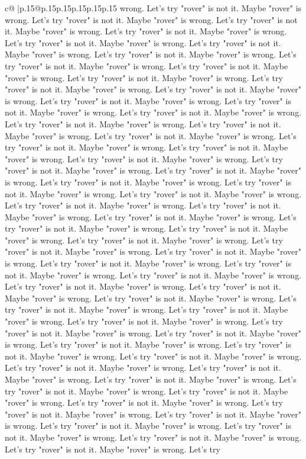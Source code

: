 \documentclass{article}
\begin{document}
{\begin{supertabular}{c@{$\;$}|p{.15\linewidth}@{}p{.15\linewidth}p{.15\linewidth}p{.15\linewidth}p{.15\linewidth}p{.15\linewidth}}
{{{wrong. Let's try "rover" is not it. Maybe "rover" is wrong. Let's try "rover" is not it. Maybe "rover" is wrong. Let's try "rover" is not it. Maybe "rover" is wrong. Let's try "rover" is not it. Maybe "rover" is wrong. Let's try "rover" is not it. Maybe "rover" is wrong. Let's try "rover" is not it. Maybe "rover" is wrong. Let's try "rover" is not it. Maybe "rover" is wrong. Let's try "rover" is not it. Maybe "rover" is wrong. Let's try "rover" is not it. Maybe "rover" is wrong. Let's try "rover" is not it. Maybe "rover" is wrong. Let's try "rover" is not it. Maybe "rover" is wrong. Let's try "rover" is not it. Maybe "rover" is wrong. Let's try "rover" is not it. Maybe "rover" is wrong. Let's try "rover" is not it. Maybe "rover" is wrong. Let's try "rover" is not it. Maybe "rover" is wrong. Let's try "rover" is not it. Maybe "rover" is wrong. Let's try "rover" is not it. Maybe "rover" is wrong. Let's try "rover" is not it. Maybe "rover" is wrong. Let's try "rover" is not it. Maybe "rover" is wrong. Let's try "rover" is not it. Maybe "rover" is wrong. Let's try "rover" is not it. Maybe "rover" is wrong. Let's try "rover" is not it. Maybe "rover" is wrong. Let's try "rover" is not it. Maybe "rover" is wrong. Let's try "rover" is not it. Maybe "rover" is wrong. Let's try "rover" is not it. Maybe "rover" is wrong. Let's try "rover" is not it. Maybe "rover" is wrong. Let's try "rover" is not it. Maybe "rover" is wrong. Let's try "rover" is not it. Maybe "rover" is wrong. Let's try "rover" is not it. Maybe "rover" is wrong. Let's try "rover" is not it. Maybe "rover" is wrong. Let's try "rover" is not it. Maybe "rover" is wrong. Let's try "rover" is not it. Maybe "rover" is wrong. Let's try "rover" is not it. Maybe "rover" is wrong. Let's try "rover" is not it. Maybe "rover" is wrong. Let's try "rover" is not it. Maybe "rover" is wrong. Let's try "rover" is not it. Maybe "rover" is wrong. Let's try "rover" is not it. Maybe "rover" is wrong. Let's try "rover" is not it. Maybe "rover" is wrong. Let's try "rover" is not it. Maybe "rover" is wrong. Let's try "rover" is not it. Maybe "rover" is wrong. Let's try "rover" is not it. Maybe "rover" is wrong. Let's try "rover" is not it. Maybe "rover" is wrong. Let's try "rover" is not it. Maybe "rover" is wrong. Let's try "rover" is not it. Maybe "rover" is wrong. Let's try "rover" is not it. Maybe "rover" is wrong. Let's try "rover" is not it. Maybe "rover" is wrong. Let's try "rover" is not it. Maybe "rover" is wrong. Let's try "rover" is not it. Maybe "rover" is wrong. Let's try "rover" is not it. Maybe "rover" is wrong. Let's try "rover" is not it. Maybe "rover" is wrong. Let's try "rover" is not it. Maybe "rover" is wrong. Let's try "rover" is not it. Maybe "rover" is wrong. Let's try "rover" is not it. Maybe "rover" is wrong. Let's try "rover" is not it. Maybe "rover" is wrong. Let's try "rover" is not it. Maybe "rover" is wrong. Let's try "rover" is not it. Maybe "rover" is wrong. Let's try "rover" is not it. Maybe "rover" is wrong. Let's try "rover" is not it. Maybe "rover" is wrong. Let's try "rover" is not it. Maybe "rover" is wrong. Let's try "rover" is not it. Maybe "rover" is wrong. Let's try }}}
\end{supertabular}}
\end{document}
